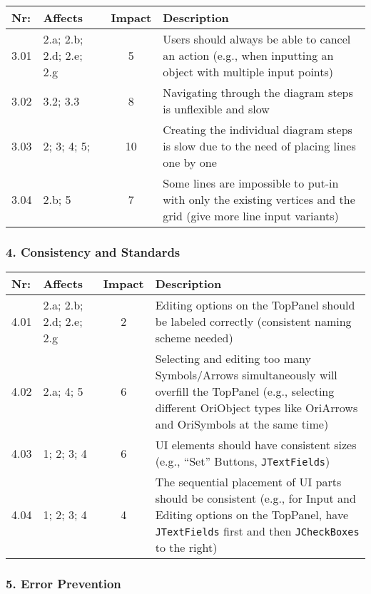         \begin{tabular}{l | p{} | c | p{}}
        Nr: & Affects & Impact & Description \\ \hline
        3.01 & 2.a; 2.b; 2.d; 2.e; 2.g  & 5 & Users should always be able to cancel an action (e.g., when inputting an object with multiple input points)\\ \hline
        3.02 & 3.2; 3.3 & 8 & Navigating through the diagram steps is unflexible and slow\\ \hline
        3.03 & 2; 3; 4; 5; & 10 & Creating the individual diagram steps is slow due to the need of placing lines one by one\\ \hline
        3.04 & 2.b; 5 & 7 & Some lines are impossible to put-in with only the existing vertices and the grid (give more line input variants)\\ \hline
        \end{tabular}


\subsubsection*{4. Consistency and Standards}

        \begin{tabular}{l | p{} | c | p{}}
        Nr: & Affects & Impact & Description \\ \hline
        4.01 & 2.a; 2.b; 2.d; 2.e; 2.g  & 2 & Editing options on the TopPanel should be labeled correctly (consistent naming scheme needed)\\ \hline 
	4.02 & 2.a; 4; 5 & 6 & Selecting and editing too many Symbols/Arrows simultaneously will overfill the TopPanel (e.g., selecting different OriObject types like OriArrows and OriSymbols at the same time)\\ \hline
	4.03 & 1; 2; 3; 4 & 6 & UI elements should have consistent sizes (e.g., ``Set'' Buttons, \texttt{JTextFields})\\ \hline
	4.04 & 1; 2; 3; 4 & 4 & The sequential placement of UI parts should be consistent (e.g., for Input and Editing options on the TopPanel, have \texttt{JTextFields} first and then \texttt{JCheckBoxes} to the right)\\ \hline
        \end{tabular}

\subsubsection*{5. Error Prevention}

